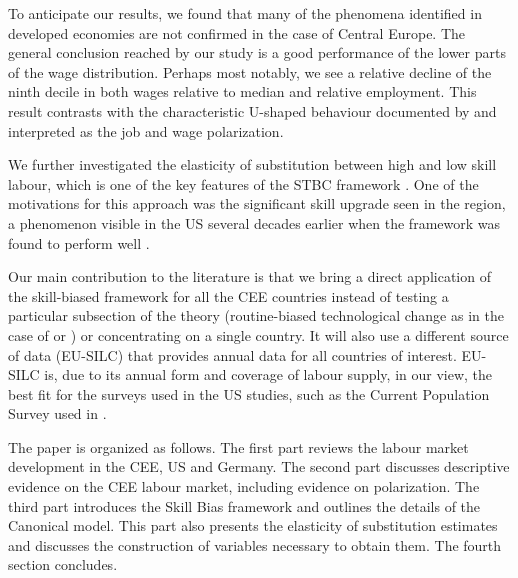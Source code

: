 \documentclass[11pt]{article}
\begin{document}
To anticipate our results, we found that many of the phenomena identified in developed economies are not confirmed in the case of Central Europe. The general conclusion reached by our study is a good performance of the lower parts of the wage distribution. Perhaps most notably, we see a relative decline of the ninth decile in both wages relative to median and relative employment. This result contrasts with the characteristic U-shaped behaviour documented by \citet{acemoglu2012does} and interpreted as the job and wage polarization. %

We further investigated the elasticity of substitution between high and low skill labour, which is one of the key features of the STBC framework \citep{katz1992changes}. One of the motivations for this approach was the significant skill upgrade seen in the region, a phenomenon visible in the US several decades earlier when the framework was found to perform well \citep{hardy2018educational}.

Our main contribution to the literature is that we bring a direct application of the skill-biased framework for all the CEE countries instead of testing a particular subsection of the theory (routine-biased technological change as in the case of \citet{arendt2019technical} or \citet{hardy2018educational}) or concentrating on a single country. It will also use a different source of data (EU-SILC) that provides annual data for all countries of interest. EU-SILC is, due to its annual form and coverage of labour supply, in our view, the best fit for the surveys used in the US studies, such as the Current Population Survey used in \citet{katz1992changes}. 

The paper is organized as follows. The first part reviews the labour market development in the CEE, US and Germany. The second part discusses descriptive evidence on the CEE labour market, including evidence on polarization. The third part introduces the Skill Bias framework and outlines the details of the Canonical model. This part also presents the elasticity of substitution estimates and discusses the construction of variables necessary to obtain them. The fourth section concludes.
\end{document}
